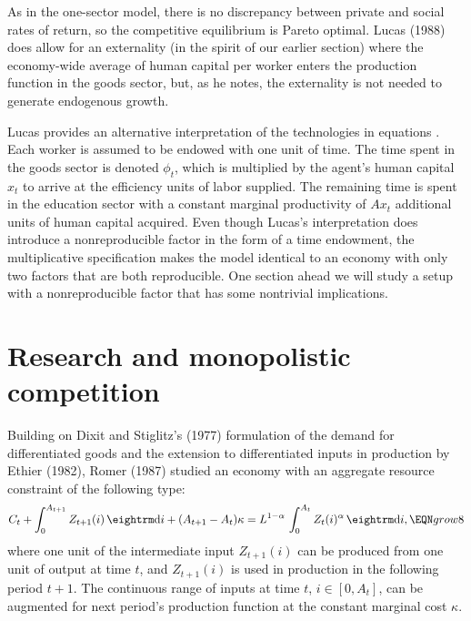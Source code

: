 As in the one-sector model, there is no discrepancy between private and
social rates of return, so the competitive equilibrium is Pareto optimal.
Lucas (1988) does allow for an externality (in the spirit of our earlier
section) where the economy-wide average
of human capital per worker enters the production function in the goods
sector, but, as he notes, the externality is not
needed to generate endogenous growth.

Lucas provides an alternative interpretation of the technologies
in equations . Each worker is assumed to be endowed with one unit of
time. The time spent in the goods sector is denoted $\phi_t$, which is
multiplied by the
agent's human capital $x_t$ to arrive at the efficiency units of
labor supplied.
The remaining time is spent in the education sector
with a constant marginal
productivity of $A x_t$ additional units of human capital acquired.
Even though Lucas's interpretation does introduce a
nonreproducible factor in the form of a time endowment, the multiplicative
specification makes the model identical to an economy with only
two factors that are both reproducible. One section ahead we will study a
setup with a nonreproducible factor that has some nontrivial implications.

\section{Research and monopolistic competition}
Building on Dixit and Stiglitz's (1977)
%
formulation of the demand for
differentiated goods and the extension to differentiated inputs in
production by Ethier (1982),
%
Romer (1987)
%
studied an economy with an aggregate resource constraint of the following type:
$$
C_t + \int_0^{A_{t+1}} Z_{t+1}(i) \, {\rm d}i + (A_{t+1}-A_t) \kappa =
L^{1-\alpha} \, \int_{0}^{A_t} Z_t (i)^\alpha \, {\rm d}i,     \EQN grow8
$$
where one unit of the intermediate input $Z_{t+1}(i)$ can be produced from
one unit of output at time $t$, and $Z_{t+1}(i)$ is used in production in
the following period $t+1$. The continuous range of inputs at time $t$,
$i\in [0, A_t]$, can be augmented for next period's production function at
the constant marginal cost $\kappa$.

